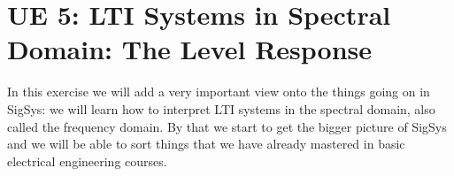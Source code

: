 
% 

\newpage
\section{UE 5: LTI Systems in Spectral Domain: The Level Response}
\label{sec:ue5_levelresponse}
\noindent In this exercise we will add a very important view onto the things
going on in SigSys: we will learn how to interpret LTI systems in the spectral
domain, also called the frequency domain. By that we start to get the bigger
picture of SigSys and we will be able to sort things that we have already mastered
in basic electrical engineering courses.

